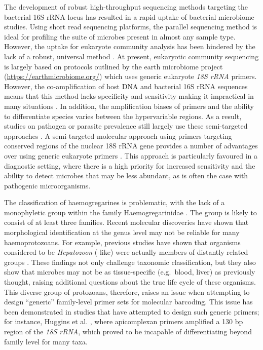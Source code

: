 \documentclass[a4paper, nobind]{templates/ociamthesis}
\begin{document}
The development of robust high-throughput sequencing methods targeting the bacterial 16S rRNA locus has resulted in a rapid uptake of bacterial microbiome studies.
Using short read sequencing platforms, the parallel sequencing method is ideal for profiling the suite of microbes present in almost any sample type.
However, the uptake for eukaryote community analysis has been hindered by the lack of a robust, universal method \autocite{hugerthSystematicDesign18S2014}.
At present, eukaryotic community sequencing is largely based on protocols outlined by the earth microbiome project (\url{https://earthmicrobiome.org/}) which uses generic eukaryote \emph{18S rRNA} primers.
However, the co-amplification of host DNA and bacterial 16S rRNA sequences means that this method lacks specificity and sensitivity making it impractical in many situations \autocite{kounosuImproved18S28S2019}.
In addition, the amplification biases of primers and the ability to differentiate species varies between the hypervariable regions.
As a result, studies on pathogen or parasite prevalence still largely use these semi-targeted approaches \autocite{ghafarTargetedNextGenerationSequencing2020,wahabNovelMetabarcoded18S2020}.
A semi-targeted molecular approach using primers targeting conserved regions of the nuclear 18S rRNA gene provides a number of advantages over using generic eukaryote primers \autocite{bradleyDesignEvaluationIllumina2016,cannonHighthroughputSequencingAssay2018a}.
This approach is particularly favoured in a diagnostic setting, where there is a high priority for increased sensitivity and the ability to detect microbes that may be less abundant, as is often the case with pathogenic microorganisms.

The classification of haemogregarines is problematic, with the lack of a monophyletic group within the family Haemogregarinidae \autocite{al-quraishyHaemogregarinesCriteriaIdentification2021}.
The group is likely to consist of at least three families.
Recent molecular discoveries have shown that morphological identification at the genus level may not be reliable for many haemoprotozoans.
For example, previous studies have shown that organisms considered to be \emph{Hepatozoon} (-like) were actually members of distantly related groups \autocite{merinoSarcocystidMisidentifiedHepatozoon2008,zhuLooksCanDeceive2009}.
These findings not only challenge taxonomic classification, but they also show that microbes may not be as tissue-specific (e.g.~blood, liver) as previously thought, raising additional questions about the true life cycle of these organisms.
This diverse group of protozoans, therefore, raises an issue when attempting to design ``generic'' family-level primer sets for molecular barcoding.
This issue has been demonstrated in studies that have attempted to design such generic primers; for instance, Huggins et al. \autocite*{hugginsNovelMetabarcodingDiagnostic2019}, where apicomplexan primers amplified a 130 bp region of the \emph{18S rRNA}, which proved to be incapable of differentiating beyond family level for many taxa.
\end{document}
